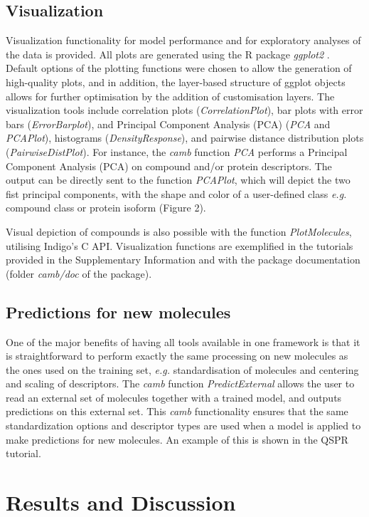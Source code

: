 \documentclass{bmcart}
\begin{document}
\subsection*{Visualization}
Visualization functionality for model performance and for exploratory analyses of the data is provided. 
All plots are generated using the R package {\it ggplot2} \cite{ggplot2}.
Default options of the plotting functions were chosen to allow the generation of high-quality plots,
and in addition, the layer-based structure of ggplot objects allows for further optimisation
by the addition of customisation layers.  
The visualization tools include correlation plots ({\it CorrelationPlot}),
bar plots with error bars ({\it ErrorBarplot}), and
Principal Component Analysis (PCA) ({\it PCA} and {\it PCAPlot}),
histograms ({\it DensityResponse}),
and pairwise distance distribution plots ({\it PairwiseDistPlot}).
For instance, the {\it camb} function {\it PCA} performs a Principal Component Analysis (PCA) 
on compound and/or protein descriptors.
The output can be directly sent to the function {\it PCAPlot},
which will depict the two fist principal components,
with the shape and color of a user-defined class
{\it e.g.} compound class or protein isoform (Figure 2).

Visual depiction of compounds is also possible with the function {\it PlotMolecules},
utilising Indigo's C API. 	
Visualization functions are exemplified in the tutorials provided in the Supplementary Information
and with the package documentation (folder {\it camb/doc} of the package).

\subsection*{Predictions for new molecules}
One of the major benefits of having all tools available in one framework is that 
it is straightforward to perform exactly the same processing on new molecules as the ones used on the training set,
{\it e.g.} standardisation of molecules and centering and scaling of descriptors.
The {\it camb} function {\it PredictExternal} allows the user to read an external set of molecules together with a trained model, 
and outputs predictions on this external set. 
This {\it camb} functionality 
ensures that the same standardization options and descriptor types are used when a model is applied to make predictions for new molecules.
An example of this is shown in the QSPR tutorial.

\section*{Results and Discussion}
\end{document}
